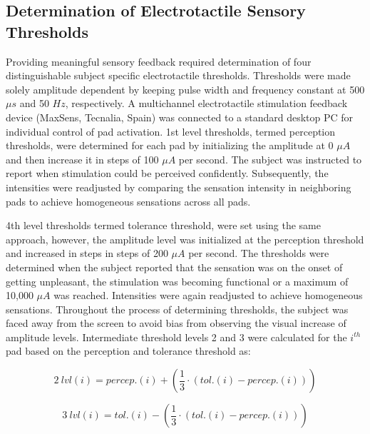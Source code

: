
\subsection{Determination of Electrotactile Sensory Thresholds}


Providing meaningful sensory feedback required determination of four distinguishable subject specific electrotactile thresholds. Thresholds were made solely amplitude dependent by keeping pulse width and frequency constant at 500 $\mu s$ and 50 $Hz$, respectively. A multichannel electrotactile stimulation feedback device (MaxSens, Tecnalia, Spain) was connected to a standard desktop PC for individual control of pad activation. 1st level thresholds, termed perception thresholds, were determined for each pad by initializing the amplitude at 0 $\mu A$ and then increase it in steps of 100 $\mu A$ per second. The subject was instructed to report when stimulation could be perceived confidently. Subsequently, the intensities were readjusted by comparing the sensation intensity in neighboring pads to achieve homogeneous sensations across all pads. 

4th level thresholds termed tolerance threshold, were set using the same approach, however, the amplitude level was initialized at the perception threshold and increased in steps in steps of 200 $\mu A$ per second. The thresholds were determined when the subject reported that the sensation was on the onset of getting unpleasant, the stimulation was becoming functional or a maximum of 10,000 $\mu A$ was reached. Intensities were again readjusted to achieve homogeneous sensations. Throughout the process of determining thresholds, the subject was faced away from the screen to avoid bias from observing the visual increase of amplitude levels. Intermediate threshold levels 2 and 3 were calculated for the $i^{th}$ pad based on the perception and tolerance threshold as: 


	\begin{equation}
	2~lvl(i) = percep.(i) + (\frac{1}{3} \cdot (tol.(i) - percep.(i)))
	\end{equation}

	\begin{equation}
	3~lvl(i) = tol.(i) - (\frac{1}{3} \cdot (tol.(i) - percep.(i)))
	\end{equation}
